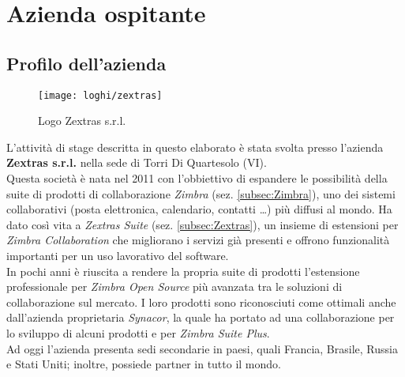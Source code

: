 \chapter{Azienda ospitante}\label{chap:company}

\section{Profilo dell'azienda}
\vspace{1cm}
\begin{figure}[H] 
	\centering
	\texttt{[image: loghi/zextras]}
	\caption{Logo Zextras s.r.l.}
	\label{fig:logoZextras}
\end{figure}
\vspace{1cm}
L'attività di stage descritta in questo elaborato è stata svolta presso l'azienda \textbf{Zextras s.r.l.} nella sede di Torri Di Quartesolo (VI). \\
Questa società è nata nel 2011 con l'obbiettivo di espandere le possibilità della suite di prodotti di collaborazione \emph{Zimbra} (sez. \ref{subsec:Zimbra}), uno dei sistemi collaborativi (posta elettronica, calendario, contatti …) più diffusi al mondo. Ha dato così vita a \emph{Zextras Suite} (sez. \ref{subsec:Zextras}), un insieme di estensioni per \emph{Zimbra Collaboration} che migliorano i servizi già presenti e offrono funzionalità importanti per un uso lavorativo del software.\\
In pochi anni è riuscita a rendere la propria suite di prodotti l'estensione professionale per \emph{Zimbra Open Source} più avanzata tra le soluzioni di collaborazione sul mercato. I loro prodotti sono riconosciuti come ottimali anche dall'azienda proprietaria \emph{Synacor}, la quale ha portato ad una collaborazione per lo sviluppo di alcuni prodotti  e per \emph{Zimbra Suite Plus}.\\
Ad oggi l'azienda presenta sedi secondarie in paesi, quali Francia, Brasile, Russia e Stati Uniti;  inoltre, possiede partner in tutto il mondo.\\

\newpage
